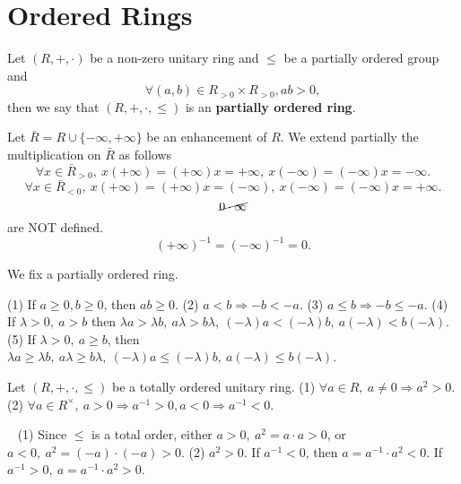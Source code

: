 \section{Ordered Rings}
\begin{definitionenv}
    Let $(R,+,\cdot)$ be a non-zero unitary ring and $\le$ be a partially ordered group and 
    $$\forall (a,b)\in R_{>0}\times R_{>0}, ab>0,$$
    then we say that $(R,+,\cdot,\le)$ is an \textbf{partially ordered ring}.

    Let $\bar{R}=R\cup\{-\infty,+\infty\}$ be an enhancement of $R$. We extend partially the multiplication on $\bar{R}$ as follows
    $$\forall x\in \bar{R}_{>0},\  x(+\infty)=(+\infty)x=+\infty,\  x(-\infty)=(-\infty)x=-\infty.$$
    $$\forall x\in \bar{R}_{<0},\  x(+\infty)=(+\infty)x=(-\infty),\  x(-\infty)=(-\infty)x=+\infty.$$
    $$\cancel{0\cdot \infty}$$
    are NOT defined.
    $$(+\infty)^{-1}=(-\infty)^{-1}=0.$$
\end{definitionenv}
We fix a partially ordered ring. 
\begin{box2}
    (1) If $a\ge 0,b\ge 0$, then $ab\ge 0$.
    \newline
    (2) $a<b\Rightarrow -b< -a$.
    \newline
    (3) $a\le b\Rightarrow -b\le -a$.
    \newline
    (4) If $\lambda>0,\ a>b$ then $\lambda a>\lambda b,\ a\lambda>b\lambda,\ (-\lambda )a<(-\lambda)b,\ a(-\lambda)<b(-\lambda)$.
    \newline
    (5) If $\lambda>0, \ a\ge b$, then $\lambda a\ge \lambda b,\ a\lambda\ge b\lambda,\ (-\lambda )a\le (-\lambda)b,\ a(-\lambda)\le b(-\lambda)$.
\end{box2}
\begin{propositionenv}
    Let $(R,+,\cdot,\le)$ be a totally ordered unitary ring. 
    \newline
    (1) $\forall a\in R,\ a\not=0\Rightarrow a^2>0.$
    \newline
    (2) $\forall a\in R^\times,\ a>0\Rightarrow a^{-1}>0, a<0\Rightarrow a^{-1}<0.$ 
\end{propositionenv}
\begin{proofenv}
    \ \newline
    (1) Since $\le$ is a total order, either $a>0,\ a^2=a\cdot a >0$, or $a<0,\ a^2=(-a)\cdot(-a)>0$.
    \newline
    (2) $a^2>0$. If $a^{-1}<0$, then $a=a^{-1}\cdot a^2<0$. If $a^{-1}>0,\ a=a^{-1}\cdot a^2>0$.
\end{proofenv}
